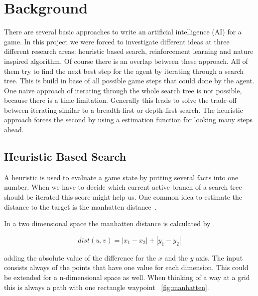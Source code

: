 

\section{Background} 
\label{sec:back}

There are several basic approaches to write an artificial intelligence (AI) for a game. In this project we were forced to investigate different ideas at three different research areas: heuristic based search, reinforcement learning and nature inspired algorithm. 
Of course there is an overlap between these approach. All of them try to find the next best step for the agent by iterating through a search tree. This is build in base of all possible game steps that could done by the agent.
One naive approach of iterating through the whole search tree is not possible, because there is a time limitation.
Generally this leads to solve the trade-off between iterating similar to a breadth-first or depth-first search.
The heuristic approach forces the second by using a estimation function for looking many steps ahead.


\subsection{Heuristic Based Search} 

A heuristic is used to evaluate a game state by putting several facts into one number. When we have to decide which current active branch of a search tree should be iterated this score might help us. 
One common idea to estimate the distance to the target is the manhatten distance~\cite{distance_metrics}. 

In a two dimensional space the manhatten distance is calculated by

\begin{equation}
dist(u,v) = |x_{1} - x_{2}| + |y_{1} - y_{2}|
\end{equation}

adding the absolute value of the difference for the $x$ and the $y$ axis. The input consists always of the points that have one value for each dimension. This could be extended for a n-dimensional space as well. When thinking of a way at a grid this is always a path with one rectangle waypoint ~\ref{fig:manhatten}.

